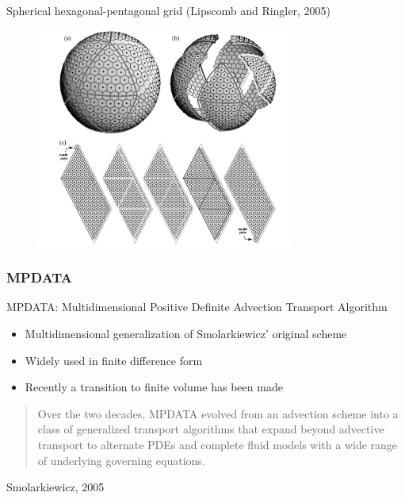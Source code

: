 \documentclass[hyperref={pdfstartview=Fit}]{beamer}
\newcommand{\imsize}{}
\begin{document}
\begin{frame}
Spherical hexagonal-pentagonal grid (Lipscomb and Ringler, 2005) 
\begin{figure}
\renewcommand{\imsize}{0.75\textwidth}
\includegraphics[width=\imsize]{lipcomb}%
\end{figure}
\end{frame}



\begin{frame}
\frametitle{MPDATA}

MPDATA: Multidimensional Positive Definite Advection Transport Algorithm

\begin{itemize}
\item Multidimensional generalization of Smolarkiewicz' original scheme
\item Widely used in finite difference form
\item Recently a transition to finite volume has been made
\end{itemize}

\begin{quotation}
Over the two decades, MPDATA evolved from an advection scheme into a class of generalized transport algorithms that expand beyond advective transport to alternate PDEs and complete fluid models with a wide range of underlying governing equations. 
\end{quotation} 
\begin{center}Smolarkiewicz, 2005\end{center}
\end{frame}
\end{document}
